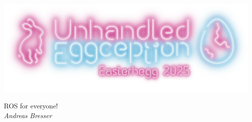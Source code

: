 \documentclass[aspectratio=169]{beamer}
\begin{document}

\begin{frame}{}
    \centering
    \includegraphics[width=.7\textwidth]{figures/logo_easterhegg.png}
    \vspace{1cm}

    ROS for everyone!\\
    \textit{Andreas Bresser}
\end{frame}
\end{document}
